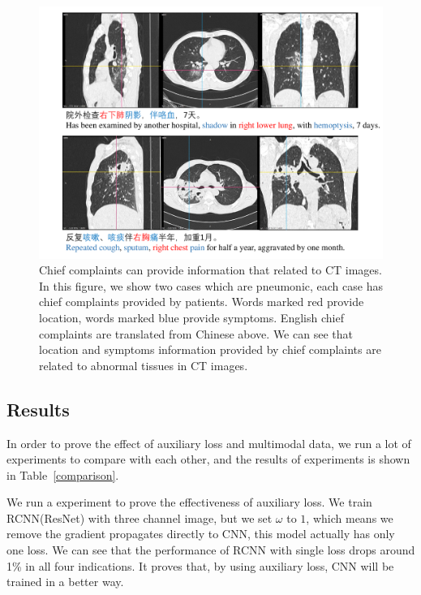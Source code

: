 \documentclass[journal]{IEEEtran}
\begin{document}
\begin{figure}[t]
\centerline{\includegraphics[width=180mm]{txtpic.pdf}}
\vspace{-0cm}
\caption{Chief complaints can provide information that related to CT images. In this figure, we show two cases which are pneumonic, each case has chief complaints provided by patients. Words marked red provide location, words marked blue provide symptoms. English chief complaints are translated from Chinese above. We can see that location and symptoms information provided by chief complaints are related to abnormal tissues in CT images.}
\vspace{-0cm}
\label{txtpic}
\end{figure}

\subsection{Results}
\label{results}
In order to prove the effect of auxiliary loss and multimodal data, we run a lot of experiments to compare with each other, and the results of experiments is shown in Table~\ref{comparison}.

We run a experiment to prove the effectiveness of auxiliary loss. We train RCNN(ResNet) with three channel image, but we set $\omega$ to $1$, which means we remove the gradient propagates directly to CNN, this model actually has only one loss. We can see that the performance of RCNN with single loss drops around 1\% in all four indications. It proves that, by using auxiliary loss, CNN will be trained in a better way. 
\end{document}
